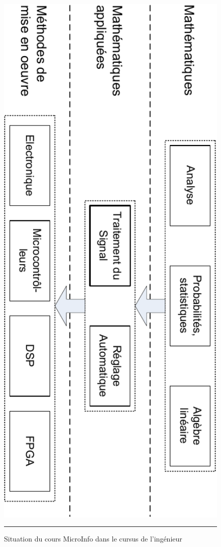 \begin{figure}[htb]
  \centering
  \includegraphics[angle=90, width=14cm]{./Figures/Branches.pdf}
  \rule{35em}{0.5pt}
  \caption[Situation]{Situation du cours MicroInfo dans le cursus de l'ingénieur}
  \label{fig:Branches}
\end{figure}


